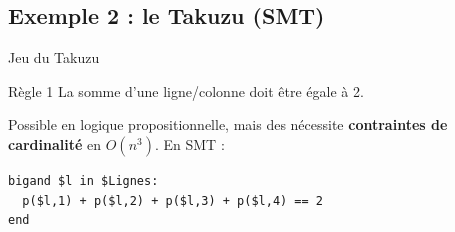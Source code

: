 \documentclass[english,french,usenames,dvipsnames]{beamer}
\begin{document}
\begin{frame}
\end{frame}

\subsection{Exemple 2 : le Takuzu (SMT)}

\begin{frame}{\subsecname}
Jeu du Takuzu
\end{frame}

\begin{frame}[containsverbatim]{\subsecname}
\begin{exampleblock}{Règle 1}
La somme d'une ligne/colonne doit être égale à 2.
\end{exampleblock}

Possible en logique propositionnelle, mais des nécessite \textbf{contraintes de cardinalité} en $O(n^3)$. En SMT :
\begin{verbatim}
bigand $l in $Lignes:
  p($l,1) + p($l,2) + p($l,3) + p($l,4) == 2
end
\end{verbatim}
\end{frame}
\end{document}
